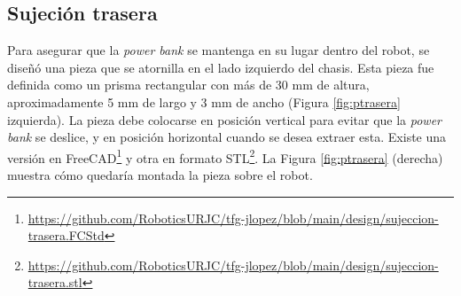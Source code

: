 \subsection{Sujeción trasera}
\label{subsec:sujecciontrasera}

Para asegurar que la \textit{power bank} se mantenga en su lugar dentro del robot, se diseñó una pieza que se atornilla en el lado izquierdo del chasis. Esta pieza fue definida como un prisma rectangular con más de 30 mm de altura, aproximadamente 5 mm de largo y 3 mm de ancho (Figura \ref{fig:ptrasera} izquierda). La pieza debe colocarse en posición vertical para evitar que la \textit{power bank} se deslice, y en posición horizontal cuando se desea extraer esta. Existe una versión en FreeCAD\footnote{\url{https://github.com/RoboticsURJC/tfg-jlopez/blob/main/design/sujeccion-trasera.FCStd}} y otra en formato STL\footnote{\url{https://github.com/RoboticsURJC/tfg-jlopez/blob/main/design/sujeccion-trasera.stl}}. La Figura \ref{fig:ptrasera} (derecha) muestra cómo quedaría montada la pieza sobre el robot.



